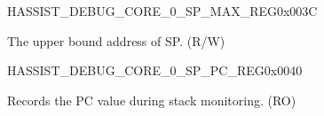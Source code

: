 \begin{register}{H}{ASSIST\_DEBUG\_CORE\_0\_SP\_MAX\_REG}{0x003C}\label{regdesc:ASSISTDEBUGCORE0SPMAXREG}
%
\regnewline%
\begin{regdesc}\begin{reglist}
\label{fielddesc:ASSISTDEBUGCORE0SPMAX}\item [ASSIST\_DEBUG\_CORE\_0\_SP\_MAX] The upper bound address of SP. (R/W)
\end{reglist}\end{regdesc}
\end{register}


\begin{register}{H}{ASSIST\_DEBUG\_CORE\_0\_SP\_PC\_REG}{0x0040}\label{regdesc:ASSISTDEBUGCORE0SPPCREG}
%
\regnewline%
\begin{regdesc}\begin{reglist}
\label{fielddesc:ASSISTDEBUGCORE0SPPC}\item [ASSIST\_DEBUG\_CORE\_0\_SP\_PC] Records the PC value during stack monitoring. (RO)
\end{reglist}\end{regdesc}
\end{register}


